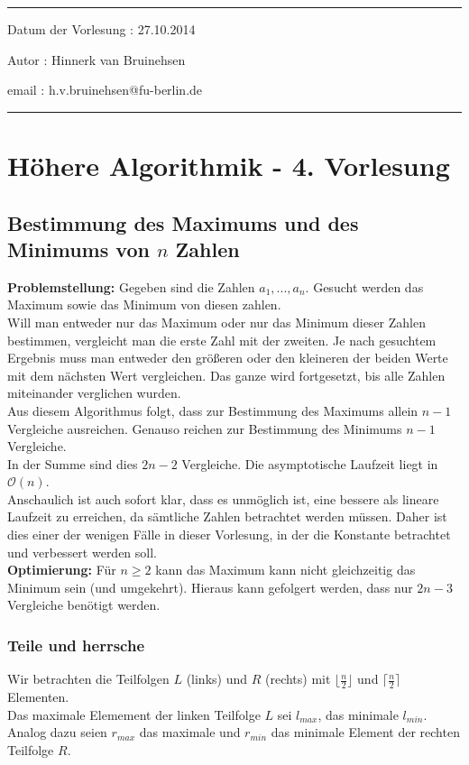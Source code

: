 \noindent \rule{\textwidth}{0.2pt}

\noindent Datum der Vorlesung : 27.10.2014

\noindent Autor : Hinnerk van Bruinehsen

\noindent email :  h.v.bruinehsen@fu-berlin.de

\noindent \rule{\textwidth}{0.2pt}


\section*{Höhere Algorithmik - 4. Vorlesung}
\subsection*{Bestimmung des Maximums und des Minimums von $n$ Zahlen}
\textbf{Problemstellung:}
Gegeben sind die Zahlen $a_1,...,a_n$. Gesucht werden das Maximum sowie das Minimum von diesen zahlen.\\
Will man entweder nur das Maximum oder nur das Minimum dieser Zahlen bestimmen, vergleicht man die erste Zahl mit der zweiten. Je nach gesuchtem Ergebnis muss man entweder den größeren oder den kleineren der beiden Werte mit dem nächsten Wert vergleichen. Das ganze wird fortgesetzt, bis alle Zahlen miteinander verglichen wurden.\\
Aus diesem Algorithmus folgt, dass zur Bestimmung des Maximums allein $n-1$ Vergleiche ausreichen. Genauso reichen zur Bestimmung des Minimums $n-1$ Vergleiche.\\
In der Summe sind dies $2n-2$ Vergleiche. Die asymptotische Laufzeit liegt in $\mathcal{O}(n)$.\\
Anschaulich ist auch sofort klar, dass es unmöglich ist, eine bessere als lineare Laufzeit zu erreichen, da sämtliche Zahlen betrachtet werden müssen. Daher ist dies einer der wenigen Fälle in dieser Vorlesung, in der die Konstante betrachtet und verbessert werden soll.\\
\textbf{Optimierung:} Für $n \geq 2$ kann das Maximum kann nicht gleichzeitig das Minimum sein (und umgekehrt). Hieraus kann gefolgert werden, dass nur $2n-3$ Vergleiche benötigt werden.\\

\subsubsection*{Teile und herrsche}
Wir betrachten die Teilfolgen $L$ (links) und $R$ (rechts) mit $\lfloor \frac{n}{2}\rfloor$ und $\lceil \frac{n}{2}\rceil$ Elementen.\\
Das maximale Elemement der linken Teilfolge $L$ sei $l_{max}$, das minimale $l_{min}$. Analog dazu seien $r_{max}$ das maximale und $r_{min}$ das minimale Element der rechten Teilfolge $R$.\\

